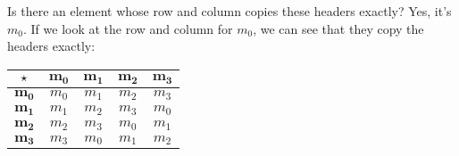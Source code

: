 \documentclass[../../../main.tex]{subfiles}
\begin{document}
\begin{fexample}
Is there an element whose row and column copies these headers exactly? Yes, it's $m_{0}$. If we look at the row and column for $m_{0}$, we can see that they copy the headers exactly:

\begin{center}
  \begin{tabular}{| c || c | c | c | c |}
    \hline
    $\opSymbol/$ & $\mathbf{m_{0}}$ & $\mathbf{m_{1}}$ & $\mathbf{m_{2}}$ & $\mathbf{m_{3}}$ \\ \hline \hline
    $\mathbf{m_{0}}$      & \cellcolor{grey3}$m_{0}$ & \cellcolor{grey3}$m_{1}$ & \cellcolor{grey3} $m_{2}$ & \cellcolor{grey3} $m_{3}$ \\ \hline
    $\mathbf{m_{1}}$      & \cellcolor{grey3} $m_{1}$ & $m_{2}$ & $m_{3}$ & $m_{0}$ \\ \hline
    $\mathbf{m_{2}}$      & \cellcolor{grey3} $m_{2}$ & $m_{3}$ & $m_{0}$ & $m_{1}$ \\ \hline
    $\mathbf{m_{3}}$      & \cellcolor{grey3} $m_{3}$ & $m_{0}$ & $m_{1}$ & $m_{2}$ \\ \hline
  \end{tabular}
\end{center}

\end{fexample}
\end{document}
